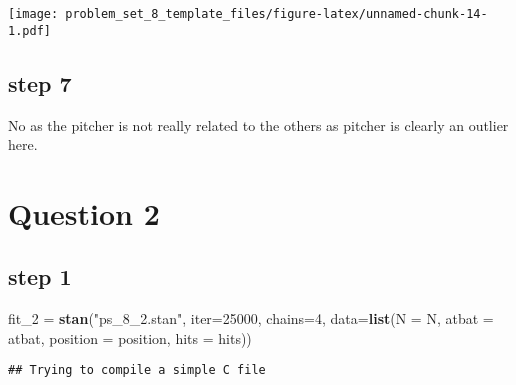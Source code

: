 \documentclass[
]{article}
\newenvironment{Shaded}{\begin{snugshade}}{\end{snugshade}}
\newcommand{\AttributeTok}[1]{\textcolor[rgb]{0.13,0.29,0.53}{#1}}
\newcommand{\DecValTok}[1]{\textcolor[rgb]{0.00,0.00,0.81}{#1}}
\newcommand{\FunctionTok}[1]{\textcolor[rgb]{0.13,0.29,0.53}{\textbf{#1}}}
\newcommand{\NormalTok}[1]{#1}
\newcommand{\OtherTok}[1]{\textcolor[rgb]{0.56,0.35,0.01}{#1}}
\newcommand{\StringTok}[1]{\textcolor[rgb]{0.31,0.60,0.02}{#1}}
\begin{document}
\texttt{[image: problem\_set\_8\_template\_files/figure-latex/unnamed-chunk-14-1.pdf]}

\hypertarget{step-7}{%
\subsection{step 7}\label{step-7}}

No as the pitcher is not really related to the others as pitcher is
clearly an outlier here.

\hypertarget{question-2}{%
\section{Question 2}\label{question-2}}

\hypertarget{step-1-1}{%
\subsection{step 1}\label{step-1-1}}

\begin{Shaded}
\begin{Highlighting}[]
\NormalTok{fit\_2 }\OtherTok{=} \FunctionTok{stan}\NormalTok{(}\StringTok{"ps\_8\_2.stan"}\NormalTok{, }\AttributeTok{iter=}\DecValTok{25000}\NormalTok{, }\AttributeTok{chains=}\DecValTok{4}\NormalTok{, }
           \AttributeTok{data=}\FunctionTok{list}\NormalTok{(}\AttributeTok{N =}\NormalTok{ N, }\AttributeTok{atbat =}\NormalTok{ atbat, }\AttributeTok{position =}\NormalTok{ position, }\AttributeTok{hits =}\NormalTok{ hits))}
\end{Highlighting}
\end{Shaded}

\begin{verbatim}
## Trying to compile a simple C file
\end{verbatim}
\end{document}
